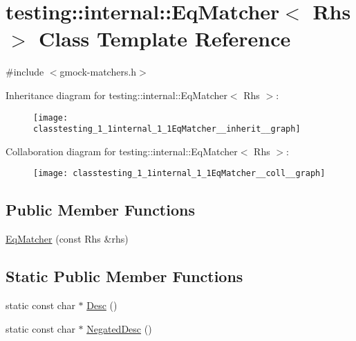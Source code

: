 \hypertarget{classtesting_1_1internal_1_1EqMatcher}{}\section{testing\+:\+:internal\+:\+:Eq\+Matcher$<$ Rhs $>$ Class Template Reference}
\label{classtesting_1_1internal_1_1EqMatcher}


{\ttfamily \#include $<$gmock-\/matchers.\+h$>$}



Inheritance diagram for testing\+:\+:internal\+:\+:Eq\+Matcher$<$ Rhs $>$\+:
\nopagebreak
\begin{figure}[H]
\begin{center}
\leavevmode
\texttt{[image: classtesting\_1\_1internal\_1\_1EqMatcher\_\_inherit\_\_graph]}
\end{center}
\end{figure}


Collaboration diagram for testing\+:\+:internal\+:\+:Eq\+Matcher$<$ Rhs $>$\+:
\nopagebreak
\begin{figure}[H]
\begin{center}
\leavevmode
\texttt{[image: classtesting\_1\_1internal\_1\_1EqMatcher\_\_coll\_\_graph]}
\end{center}
\end{figure}
\subsection*{Public Member Functions}
\begin{DoxyCompactItemize}
\item 
\hyperlink{classtesting_1_1internal_1_1EqMatcher_a9051e33bc31f413a3c958d04cc090b46}{Eq\+Matcher} (const Rhs \&rhs)
\end{DoxyCompactItemize}
\subsection*{Static Public Member Functions}
\begin{DoxyCompactItemize}
\item 
static const char $\ast$ \hyperlink{classtesting_1_1internal_1_1EqMatcher_a3ddc72ceade061ad56debfa0a4dc2749}{Desc} ()
\item 
static const char $\ast$ \hyperlink{classtesting_1_1internal_1_1EqMatcher_ae99a542c124694d5b91793a2df9202dc}{Negated\+Desc} ()
\end{DoxyCompactItemize}


